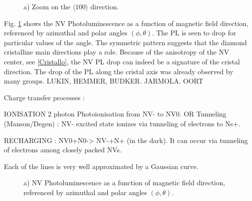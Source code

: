\documentclass[preprintnumbers,amsmath,amssymb,twocolumn]{revtex4-1}
\begin{document}
\begin{figure}[!ht]
  \caption{a) 
Zoom on the $\langle 100 \rangle$ direction. 
 }
\end{figure}

Fig. \ref{Map} shows the NV Photoluminescence as a function of magnetic field direction, referenced by azimuthal and polar angles $(\phi, \theta)$. The PL is seen to drop for particular values of the angle. The symmetric pattern suggests that the diamond cristalline main directions play a role. Because of the anisotropy of the NV center, see \ref{Cristallo}, the NV PL drop can indeed be a signature of the cristal direction.
The drop of the PL along the cristal axis was already observed by many groups. LUKIN, HEMMER, BUDKER. JARMOLA. OORT
\cite{van_oort_optically_1991, van_oort_cross-relaxation_1989, armstrong_nvnv_2010, jarmola_longitudinal_2015, akhmedzhanov_microwave-free_2017, akhmedzhanov_magnetometry_2019, holliday_optical_1989, choi_depolarization_2017}

Charge transfer processes : 

IONISATION
2 photon Photoionisation from NV- to NV0.
OR 
Tunneling (Manson/Degen) : NV- excited state ionizes via tunneling of electrons to Ns+.

RECHARGING  : 
NV0+N0-> NV-+N+ (in the dark). 
It can occur via tunneling of electrons among closely packed NVs. 

Each of the lines is very well approximated by a Gaussian curve.


\begin{figure}[!ht]
  \caption{a) 
NV Photoluminescence as a function of magnetic field direction, referenced by azimuthal and polar angles $(\phi, \theta)$.  }\label{Map}
\end{figure}
\end{document}
